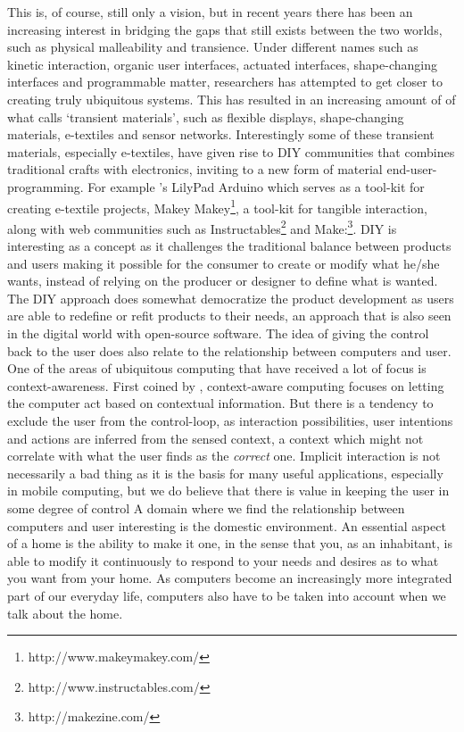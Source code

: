 This is, of course, still only a vision, but in recent years there has been an increasing interest in bridging the gaps that still exists between the two worlds, such as physical malleability and transience.
Under different names such as kinetic interaction, organic user interfaces, actuated interfaces, shape-changing interfaces and programmable matter, researchers has attempted to get closer to creating truly ubiquitous systems.    
This has resulted in an increasing amount of of what \citet{coelho2009programming} calls `transient materials', such as flexible displays, shape-changing materials, e-textiles and sensor networks.
\blank
Interestingly some of these transient materials, especially e-textiles, have given rise to DIY communities that combines traditional crafts with electronics, inviting to a new form of material end-user-programming.
For example \citet{buechley2008lilypad}'s LilyPad Arduino which serves as a tool-kit for creating e-textile projects, Makey Makey\footnote{http://www.makeymakey.com/}, a tool-kit for tangible interaction, along with web communities such as Instructables\footnote{http://www.instructables.com/} and Make:\footnote{http://makezine.com/}.
DIY is interesting as a concept as it challenges the traditional balance between products and users making it possible for the consumer to create  or modify what he/she wants, instead of relying on the producer or designer to define what is wanted.
The DIY approach does somewhat democratize the product development as users are able to redefine or refit products to their needs, an approach that is also seen in the digital world with open-source software.
\blank
The idea of giving the control back to the user does also relate to the relationship between computers and user.
One of the areas of ubiquitous computing that have received a lot of focus is context-awareness.
First coined by \citet{schilit1994context}, context-aware computing focuses on letting the computer act based on contextual information.
But there is a tendency to exclude the user from the control-loop, as interaction possibilities, user intentions and actions are inferred from the sensed context, a context which might not correlate with what the user finds as the \emph{correct} one.
Implicit interaction is not necessarily a bad thing as it is the basis for many useful applications, especially in mobile computing, but we do believe that there is value in keeping the user in some degree of control
\blank
A domain where we find the relationship between computers and user interesting is the domestic environment.
An essential aspect of a home is the ability to make it one, in the sense that you, as an inhabitant, is able to modify it continuously to respond to your needs and desires as to what you want from your home.
As computers become an increasingly more integrated part of our everyday life, computers also have to be taken into account when we talk about the home.

